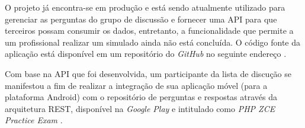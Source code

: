 O projeto já encontra-se em produção e está sendo atualmente utilizado para 
gerenciar as perguntas do grupo de discussão e fornecer uma \ac{API} para que 
terceiros possam consumir os dados, entretanto, a funcionalidade que permite a
um profissional realizar um simulado ainda não está concluída. O código fonte da
aplicação está disponível em um repositório do \textit{GitHub} no seguinte
endereço \cite{githubZCPE}.

Com base na \acs{API} que foi desenvolvida, um participante da lista de discução
se manifestou a fim de realizar a integração de sua aplicação móvel (para a
plataforma Android) com o repositório de perguntas e respostas através da arquitetura
\ac{REST}, disponível na \textit{Google Play} e intitulado como \textit{PHP ZCE
Practice Exam} \cite{googlePlayPHPZCEPracticeExam}.




